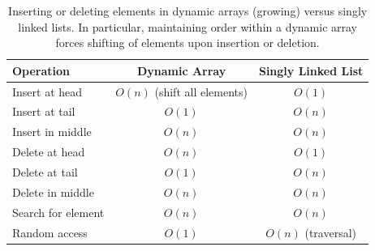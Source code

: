 \begin{table}[ht!]
    \centering
    \begin{tabular}{l|c|c}
        \hline
        \textbf{Operation}      & \textbf{Dynamic Array}       & \textbf{Singly Linked List} \\ \hline
        Insert at head          & $O(n)$ (shift all elements) & $O(1)$                       \\
        Insert at tail          & $O(1)$                       & $O(n)$                       \\
        Insert in middle        & $O(n)$                        & $O(n)$                       \\ \hline
        Delete at head          & $O(n)$                        & $O(1)$                       \\
        Delete at tail          & $O(1)$                        & $O(n)$                       \\
        Delete in middle        & $O(n)$                        & $O(n)$                       \\ \hline 
        Search for element      & $O(n)$                        & $O(n)$                       \\
        Random access           & $O(1)$                        & $O(n)$ (traversal)           \\
    \end{tabular}
    \caption{Inserting or deleting elements in dynamic arrays (growing) versus singly linked lists. In particular,
    maintaining order within a dynamic array forces shifting of elements upon insertion or deletion.}

\end{table}
